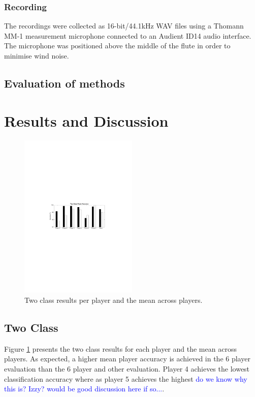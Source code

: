 \documentclass{article}
\newcommand{\carl}[1]{\textcolor{blue}{#1}}
\begin{document}
{{{\subsubsection{Recording} \label{sec:recording}
The recordings were collected as 16-bit/44.1kHz WAV files using a Thomann MM-1 measurement microphone connected to an Audient ID14 audio interface. The microphone was positioned above the middle of the flute in order to minimise wind noise. 
 



\subsection{Evaluation of methods}\label{sec:evalmeth}






\section{Results and Discussion}\label{sec:results}

\begin{figure}[h]
\includegraphics[width=0.5\textwidth]{figs/PlayerPDF}
\caption{Two class results per player and the mean across players.}
\label{PlayerGraph}
\end{figure}

\subsection{Two Class}

Figure \ref{PlayerGraph} presents the two class results for each player and the mean across players. As expected, a higher mean player accuracy is achieved in the 6 player evaluation than the 6 player and other evaluation. Player 4 achieves the lowest classification accuracy where as player 5 achieves the highest \carl{do we know why this is? Izzy? would be good discussion here if so...}.

}}}
\end{document}

